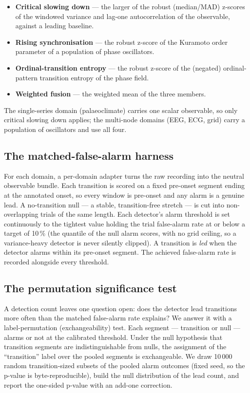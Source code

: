 \documentclass[11pt]{article}
\begin{document}
\begin{itemize}
  \item \textbf{Critical slowing down} --- the larger of the robust
    (median/MAD) z-scores of the windowed variance and lag-one
    autocorrelation of the observable, against a leading baseline.
  \item \textbf{Rising synchronisation} --- the robust z-score of the
    Kuramoto order parameter of a population of phase oscillators.
  \item \textbf{Ordinal-transition entropy} --- the robust z-score of
    the (negated) ordinal-pattern transition entropy of the phase
    field.
  \item \textbf{Weighted fusion} --- the weighted mean of the three
    members.
\end{itemize}

The single-series domain (palaeoclimate) carries one scalar observable,
so only critical slowing down applies; the multi-node domains (EEG,
ECG, grid) carry a population of oscillators and use all four.

\subsection{The matched-false-alarm harness}

For each domain, a per-domain adapter turns the raw recording into the
neutral observable bundle. Each transition is scored on a fixed
pre-onset segment ending at the annotated onset, so every window is
pre-onset and any alarm is a genuine lead. A no-transition null --- a
stable, transition-free stretch --- is cut into non-overlapping trials
of the same length. Each detector's alarm threshold is set continuously
to the tightest value holding the trial false-alarm rate at or below a
target of 10\,\% (the quantile of the null alarm scores, with no grid
ceiling, so a variance-heavy detector is never silently clipped). A
transition is \emph{led} when the detector alarms within its pre-onset
segment. The achieved false-alarm rate is recorded alongside every
threshold.

\subsection{The permutation significance test}

A detection count leaves one question open: does the detector lead
transitions more often than the matched false-alarm rate explains? We
answer it with a label-permutation (exchangeability) test. Each segment
--- transition or null --- alarms or not at the calibrated threshold.
Under the null hypothesis that transition segments are indistinguishable
from nulls, the assignment of the ``transition'' label over the pooled
segments is exchangeable. We draw 10\,000 random transition-sized
subsets of the pooled alarm outcomes (fixed seed, so the p-value is
byte-reproducible), build the null distribution of the lead count, and
report the one-sided p-value with an add-one correction.
\end{document}
